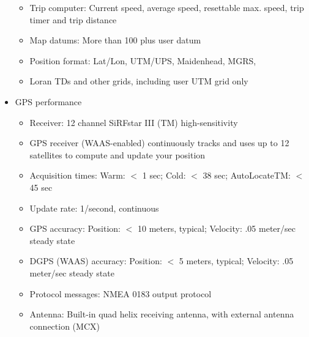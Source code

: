 \begin{itemize}
\begin{itemize}
			\item Trip computer: Current speed, average speed, resettable max. speed, trip timer and trip distance 
			\item Map datums: More than 100 plus user datum 
			\item Position format: Lat/Lon, UTM/UPS, Maidenhead, MGRS, 
			\item Loran TDs and other grids, including user UTM grid only 
		\end{itemize}
	\item GPS performance 
		\begin{itemize}
			\item Receiver: 12 channel SiRFstar III (TM) high-sensitivity 
			\item GPS receiver (WAAS-enabled) continuously tracks and uses up to 12 satellites to compute and update your position 
			\item Acquisition times: Warm: $<$ 1 sec; Cold: $<$ 38 sec; AutoLocateTM: $<$ 45 sec 
			\item Update rate: 1/second, continuous 
			\item GPS accuracy: Position: $<$ 10 meters, typical; Velocity: .05 meter/sec steady state 
			\item DGPS (WAAS) accuracy: Position: $<$ 5 meters, typical; Velocity: .05 meter/sec steady state 
			\item Protocol messages: NMEA 0183 output protocol 
			\item Antenna: Built-in quad helix receiving antenna, with external antenna connection (MCX)
		\end{itemize}
\end{itemize}
